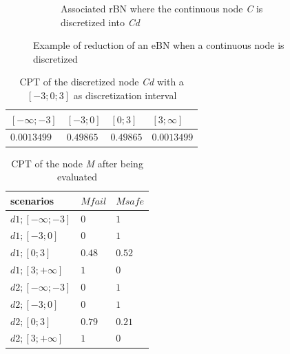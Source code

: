 \begin{figure}[h]
\begin{subfigure}{0.45\textwidth}
        \caption{Associated rBN where the continuous node \textit{C} is discretized into \textit{Cd}}\label{1_rbn_disc_example}
    \end{subfigure}
    \caption{Example of reduction of an eBN when a continuous node is discretized}\label{1_reduction_disc}
\end{figure}

\begin{table}[hbt!]
    \begin{center}
        \caption{CPT of the discretized node \textit{Cd} with a $[-3;0;3]$ as discretization interval}\label{exact_disc_tab}
        \begin{tabular}{P{1.5cm}P{1.5cm}P{1.5cm}P{1.5cm}}
            \textbf{$[-\infty;-3]$} & \textbf{$[-3;0]$} & \textbf{$[0;3]$} & \textbf{$[3;\infty]$} \\
            \midrule
            $0.0013499$ & $ 0.49865$ & $ 0.49865$ & $0.0013499$ \\
        \end{tabular}
    \end{center}
\end{table}

\begin{table}[hbt!]
    \begin{center}
        \caption{CPT of the node \textit{M} after being evaluated}\label{Mnode_tab}
        \begin{tabular}{P{2cm}P{2cm}P{2cm}}
            \textbf{scenarios} & \textbf{$M fail$} & \textbf{$M safe$} \\
            \midrule
            $d1;[-\infty;-3]$ & $0$ & $1$ \\
            $d1;[-3;0]$ & $0$ & $1$ \\
            $d1;[0;3]$ & $ 0.48$ & $0.52$ \\
            $d1;[3;+\infty]$ & $ 1$ & $0$ \\
            $d2;[-\infty;-3]$ & $0$ & $1$ \\
            $d2;[-3;0]$ & $0$ & $1$ \\
            $d2;[0;3]$ & $0.79$ & $0.21$ \\
            $d2;[3;+\infty]$ & $1$ & $0$ \\
        \end{tabular}
    \end{center}
\end{table}

